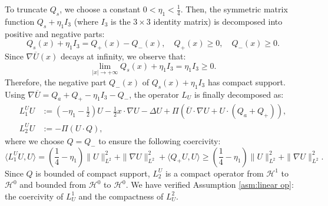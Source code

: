 \documentclass[11pt,a4paper]{article}
\numberwithin{equation}{section}
\newcommand{\assign}{:=}
\begin{document}
To truncate $Q_s$, we choose a constant $0 < \eta_1 < \frac{1}{4}$. Then, the
symmetric matrix function $Q_s + \eta_1 I_3$ (where $I_3$ is the $3 \times 3$
identity matrix) is decomposed into positive and negative parts:
\[ Q_s (x) + \eta_1 I_3 = Q_{+} (x) - Q_{-} (x), \quad Q_{+} (x) \geqslant 0, \quad Q_{-}
   (x) \geqslant 0. \]
Since $\nabla \overline{U} (x)$ decays at infinity, we observe that:
\[ \lim_{| x | \to + \infty} Q_s (x) + \eta_1 I_3 = \eta_1 I_3
   \geqslant 0. \]
Therefore, the negative part $Q_{-} (x)$ of $Q_s (x)+ \eta_1 I_3 $ has compact support. Using $\nabla\overline{U}=Q_a+Q_{+}-\eta_1I_3-Q_{-}$, the operator $L_U$ is finally decomposed as:
    \begin{align}
         L_1^U U & \assign  ( - \eta_1 - \frac{1}{2} ) U - \frac{1}{2} x
  \cdot \nabla U - \Delta U + \Pi (\overline{U} \cdot \nabla U + U \cdot (Q_a
  + Q_{+}) ), \label{eq:L1 def}\\ 
  L_2^U U & \assign  -\Pi (U \cdot Q), \label{eq:L2 def}
    \end{align}
where we choose $Q=Q_{-}$ to ensure the following coercivity:
\begin{equation}
    \langle L_1^U U, U \rangle = ( \frac{1}{4} - \eta_1 ) \| U
   \|_{L^2}^2 + \| \nabla U \|_{L^2}^2 + \langle Q_{+} U, U \rangle \geqslant (
   \frac{1}{4} - \eta_1 ) \| U \|_{L^2}^2 + \| \nabla U \|_{L^2}^2 . \label{l1u c}
\end{equation} 
Since $Q$ is bounded of compact support, $L_2^U$ is a compact operator from
$\mathcal{H}^1$ to $\mathcal{H}^0$ and bounded from $\mathcal{H}^0$ to $\mathcal{H}^0$. We have verified Assumption \ref{asm:linear
op}: the coercivity of $L_U^1$ and the compactness of $L_U^2$.
\end{document}
